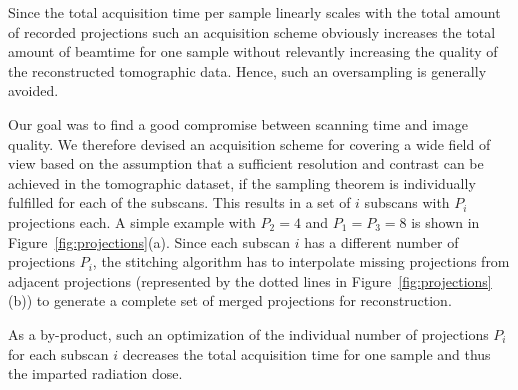 Since the total acquisition time per sample linearly scales with the total amount of recorded projections such an acquisition scheme obviously increases the total amount of beamtime for one sample without relevantly increasing the quality of the reconstructed tomographic data. Hence, such an oversampling is generally avoided.

Our goal was to find a good compromise between scanning time and image quality. We therefore devised an acquisition scheme for covering a wide field of view based on the assumption that a sufficient resolution and contrast can be achieved in the tomographic dataset, if the sampling theorem is individually fulfilled for each of the subscans. This results in a set of $i$ subscans with $P_{i}$ projections each. A simple example with $P_{2}=4$ and $P_{1}=P_{3}=8$ is shown in Figure~\ref{fig:projections}(a). Since each subscan $i$ has a different number of projections $P_{i}$, the stitching algorithm has to interpolate missing projections from adjacent projections (represented by the dotted lines in Figure~\ref{fig:projections}(b)) to generate a complete set of merged projections for reconstruction.

As a by-product, such an optimization of the individual number of projections $P_{i}$ for each subscan $i$ decreases the total acquisition time for one sample and thus the imparted radiation dose.


